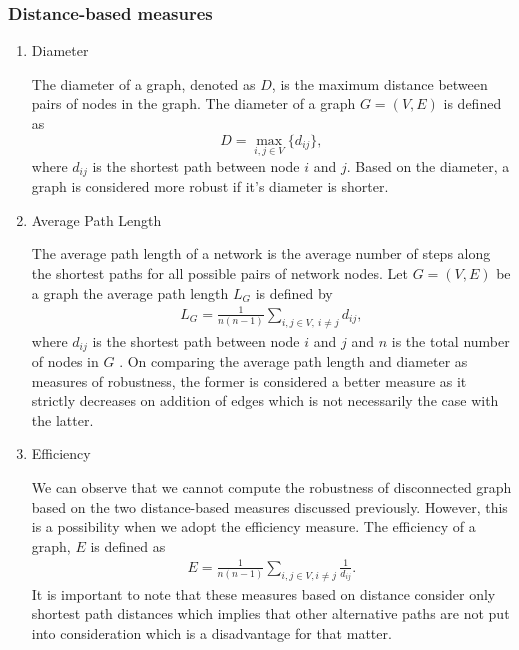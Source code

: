 \documentclass[10pt,a4paper]{article}
\begin{document}
	\subsubsection{Distance-based measures}
	\begin{enumerate}
		\item Diameter
	
		The diameter of a graph, denoted as $D$, is the maximum distance between pairs of nodes in the graph\citep{wang2003complex}. The diameter of a graph $G= (V,E )$ is defined as \[ D = \max_{i,j \in V} \{d_{ij}\},\] where $d_{ij}$ is the shortest path between node $i$ and $j$. Based on the diameter, a graph is considered more robust if it's diameter is shorter.
		\item Average Path Length
		
		The average path length of a network is the average number of steps along the shortest paths for all possible pairs of network nodes. Let $G = (V , E )$ be a graph the average path length $L_G$ is defined by
		\begin{eqnarray}
		L_G = \frac{1}{n(n-1)} \sum_{i,j \in V,~i \neq j} d_{ij},
		\end{eqnarray}
		where $d_{ij}$ is the shortest path between node $i$ and $j$ and $n$ is the total number of nodes in $G$ \citep{wang2003complex}. 
		On comparing the average path length and diameter as measures of robustness, the former is considered a better measure as it strictly decreases on addition of edges which is not necessarily the case with the latter.
		\item Efficiency
		
		We can observe that we cannot compute the robustness of disconnected graph based on the two distance-based measures discussed previously. However, this is a possibility when we adopt the efficiency measure. 
		The efficiency of a graph, $E$ is defined as
		\begin{eqnarray}
			E =\frac{1}{n(n-1)} \sum_{i,j \in V,i\neq j} \frac{1}{d_{ij}}.
			\label{eqn:eff}
		\end{eqnarray}
		It is important to note that these measures based on distance consider only shortest path distances which implies that other alternative paths are not put into consideration which is a disadvantage for that matter.
	\end{enumerate}
	
	
\end{document}
